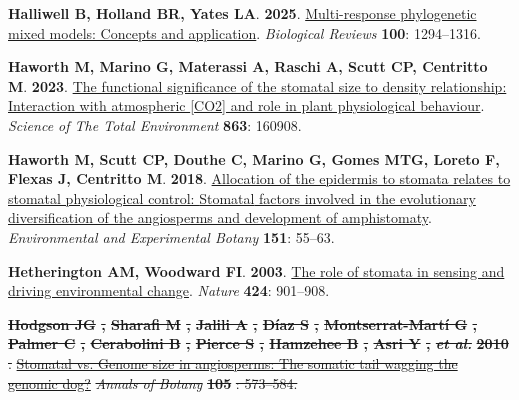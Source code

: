 \documentclass[
  letterpaper,
  DIV=11,
  numbers=noendperiod]{scrartcl}
\newlength{\cslhangindent}
\newenvironment{CSLReferences}[2] %
 {\begin{list}{}{%
  \setlength{\itemindent}{0pt}
  \setlength{\leftmargin}{0pt}
  \setlength{\parsep}{0pt}
  \ifodd #1
   \setlength{\leftmargin}{\cslhangindent}
   \setlength{\itemindent}{-1\cslhangindent}
  \fi
  \setlength{\itemsep}{#2\baselineskip}}}
 {\end{list}}
\providecommand{\DIFdeltex}[1]{{\protect\color{red}\sout{#1}}}                      %
\providecommand{\DIFdelbegin}{} %
\providecommand{\DIFdel}[1]{\texorpdfstring{\DIFdeltex{#1}}{}} %
\newcommand{\DIFscaledelfig}{0.5}
\newlength{\DIFdelgraphicswidth} %
\newlength{\DIFdelgraphicsheight} %
\newcommand{\DIFdelincludegraphics}[2][]{%
\sbox{\DIFdelgraphicsbox}{\DIFOincludegraphics[#1]{#2}}%
\settoboxwidth{\DIFdelgraphicswidth}{\DIFdelgraphicsbox} %
\settoboxtotalheight{\DIFdelgraphicsheight}{\DIFdelgraphicsbox} %
\scalebox{\DIFscaledelfig}{%
\parbox[b]{\DIFdelgraphicswidth}{\usebox{\DIFdelgraphicsbox}\\[-\baselineskip] \rule{\DIFdelgraphicswidth}{0em}}\llap{\resizebox{\DIFdelgraphicswidth}{\DIFdelgraphicsheight}{%
\setlength{\unitlength}{\DIFdelgraphicswidth}%
\begin{picture}(1,1)%
\thicklines\linethickness{2pt} %
{\color[rgb]{1,0,0}\put(0,0){\framebox(1,1){}}}%
{\color[rgb]{1,0,0}\put(0,0){\line( 1,1){1}}}%
{\color[rgb]{1,0,0}\put(0,1){\line(1,-1){1}}}%
\end{picture}%
}\hspace*{3pt}}} %
} %
\DeclareRobustCommand{\DIFdelbegin}{\DIFOdelbegin \let\includegraphics\DIFdelincludegraphics} %
\begin{document}
\begin{CSLReferences}{0}{1}
\textbf{\textbf{Halliwell B}, \textbf{Holland BR}, \textbf{Yates LA}}.
\textbf{2025}. \href{https://doi.org/10.1111/brv.70001}{Multi-response
phylogenetic mixed models: Concepts and application}. \emph{Biological
Reviews} \textbf{100}: 1294--1316.

\textbf{\textbf{Haworth M}, \textbf{Marino G}, \textbf{Materassi A},
\textbf{Raschi A}, \textbf{Scutt CP}, \textbf{Centritto M}}.
\textbf{2023}.
\href{https://doi.org/10.1016/j.scitotenv.2022.160908}{The functional
significance of the stomatal size to density relationship: {Interaction}
with atmospheric {[}{CO2}{]} and role in plant physiological behaviour}.
\emph{Science of The Total Environment} \textbf{863}: 160908.

\textbf{\textbf{Haworth M}, \textbf{Scutt CP}, \textbf{Douthe C},
\textbf{Marino G}, \textbf{Gomes MTG}, \textbf{Loreto F}, \textbf{Flexas
J}, \textbf{Centritto M}}. \textbf{2018}.
\href{https://doi.org/10.1016/j.envexpbot.2018.04.010}{Allocation of the
epidermis to stomata relates to stomatal physiological control:
{Stomatal} factors involved in the evolutionary diversification of the
angiosperms and development of amphistomaty}. \emph{Environmental and
Experimental Botany} \textbf{151}: 55--63.

\textbf{\textbf{Hetherington AM}, \textbf{Woodward FI}}. \textbf{2003}.
\href{https://doi.org/10.1038/nature01843}{The role of stomata in
sensing and driving environmental change}. \emph{Nature} \textbf{424}:
901--908.

\DIFdelbegin {}
\textbf{%
\textbf{\DIFdel{Hodgson JG}}%
\DIFdel{, }\textbf{\DIFdel{Sharafi M}}%
\DIFdel{, }\textbf{\DIFdel{Jalili A}}%
\DIFdel{,
}\textbf{\DIFdel{Díaz S}}%
\DIFdel{, }\textbf{\DIFdel{Montserrat-Martí G}}%
\DIFdel{, }\textbf{\DIFdel{Palmer C}}%
\DIFdel{,
}\textbf{\DIFdel{Cerabolini B}}%
\DIFdel{, }\textbf{\DIFdel{Pierce S}}%
\DIFdel{, }\textbf{\DIFdel{Hamzehee B}}%
\DIFdel{,
}\textbf{\DIFdel{Asri Y}}%
\DIFdel{, }\emph{\DIFdel{et al.}}%
} %
\textbf{\DIFdel{2010}}%
\DIFdel{.
}\href{https://doi.org/10.1093/aob/mcq011}{\DIFdel{Stomatal vs. Genome size in
angiosperms: The somatic tail wagging the genomic dog?}} %
\emph{\DIFdel{Annals of
Botany}} %
\textbf{\DIFdel{105}}%
\DIFdel{: 573--584.
}%


\end{CSLReferences}
\end{document}
